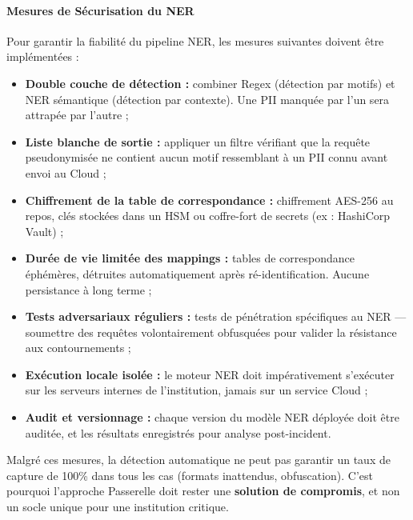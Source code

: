\documentclass[12pt, a4paper]{report}
\begin{document}
\paragraph{Mesures de Sécurisation du NER}

Pour garantir la fiabilité du pipeline NER, les mesures suivantes doivent
être implémentées :

\begin{itemize}
  \item \textbf{Double couche de détection :} combiner Regex (détection
        par motifs) et NER sémantique (détection par contexte). Une PII
        manquée par l'un sera attrapée par l'autre ;
  \item \textbf{Liste blanche de sortie :} appliquer un filtre vérifiant
        que la requête pseudonymisée ne contient aucun motif ressemblant
        à un PII connu avant envoi au Cloud ;
  \item \textbf{Chiffrement de la table de correspondance :} chiffrement
        AES-256 au repos, clés stockées dans un HSM ou coffre-fort de
        secrets (ex : HashiCorp Vault) ;
  \item \textbf{Durée de vie limitée des mappings :} tables de
        correspondance éphémères, détruites automatiquement après
        ré-identification. Aucune persistance à long terme ;
  \item \textbf{Tests adversariaux réguliers :} tests de pénétration
        spécifiques au NER --- soumettre des requêtes volontairement
        obfusquées pour valider la résistance aux contournements ;
  \item \textbf{Exécution locale isolée :} le moteur NER doit
        impérativement s'exécuter sur les serveurs internes de
        l'institution, jamais sur un service Cloud ;
  \item \textbf{Audit et versionnage :} chaque version du modèle NER
        déployée doit être auditée, et les résultats enregistrés pour
        analyse post-incident.
\end{itemize}

\begin{tcolorbox}[cmrbox, title={Limite structurelle de l'approche Passerelle}]
Malgré ces mesures, la détection automatique ne peut pas garantir un
taux de capture de 100\% dans tous les cas (formats inattendus,
obfuscation). C'est pourquoi l'approche Passerelle doit rester une
\textbf{solution de compromis}, et non un socle unique pour une
institution critique.
\end{tcolorbox}
\end{document}
